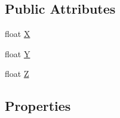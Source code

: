 \subsection*{Public Attributes}
\begin{DoxyCompactItemize}
\item 
float \hyperlink{struct_microsoft_1_1_xna_1_1_framework_1_1_vector3_af25fead2138927db279b3205dacbc0bb}{X}
\item 
float \hyperlink{struct_microsoft_1_1_xna_1_1_framework_1_1_vector3_a58f03de150e232d83a4a0c6df89d0688}{Y}
\item 
float \hyperlink{struct_microsoft_1_1_xna_1_1_framework_1_1_vector3_a60e9a09ffcb89ad48a76eb8d1580dd70}{Z}
\end{DoxyCompactItemize}
\subsection*{Properties}
